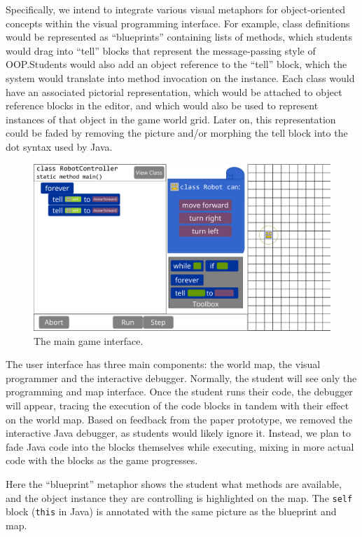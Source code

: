 \documentclass[12pt,notitlepage]{article}
\begin{document}
Specifically, we intend to integrate various visual metaphors for
object-oriented concepts within the visual programming interface. For
example, class definitions would be represented as ``blueprints''
containing lists of methods, which students would drag into ``tell''
blocks that represent the message-passing style of OOP.\@ Students
would also add an object reference to the ``tell'' block, which the
system would translate into method invocation on the instance. Each
class would have an associated pictorial representation, which would
be attached to object reference blocks in the editor, and which would
also be used to represent instances of that object in the game world
grid. Later on, this representation could be faded by removing the
picture and/or morphing the tell block into the dot syntax used by
Java.

\begin{figure}[h]
  \centering
  \includegraphics[width=\textwidth]{mockup.pdf}
  \caption{The main game interface.}
\end{figure}

The user interface has three main components: the world map, the
visual programmer and the interactive debugger. Normally, the student
will see only the programming and map interface. Once the student runs
their code, the debugger will appear, tracing the execution of the
code blocks in tandem with their effect on the world map. Based on
feedback from the paper prototype, we removed the interactive Java
debugger, as students would likely ignore it. Instead, we plan to fade
Java code into the blocks themselves while executing, mixing in more
actual code with the blocks as the game progresses.

Here the ``blueprint'' metaphor shows the student what methods are
available, and the object instance they are controlling is highlighted
on the map. The \texttt{self} block (\texttt{this} in Java) is
annotated with the same picture as the blueprint and map.
\end{document}
